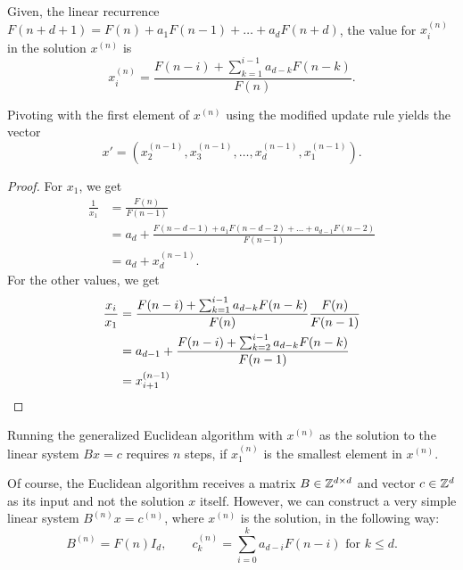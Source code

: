 Given, the linear recurrence $F(n + d + 1) = F(n) + a_1 F(n - 1) + \dots + a_d F(n + d)$,
the value for $x_i^{(n)}$ in the solution $x^{(n)}$ is
\begin{equation}
  \label{eq:general-solution}
  x_i^{(n)} = \frac{F(n - i) + \sum_{k=1}^{i-1} a_{d-k} F(n - k)}{F(n)}.
\end{equation}

\begin{lemma}
  Pivoting with the first element of $x^{(n)}$ using the modified update rule yields the vector
  \[
    x' = (x^{(n-1)}_2, x^{(n-1)}_3, \dots, x^{(n-1)}_d, x^{(n-1)}_1).
  \]
\end{lemma}

\begin{proof}
  For $x_1$, we get
  \[
    \begin{aligned}
      \frac{1}{x_1}
      & = \frac{F(n)}{F(n - 1)} \\
      & = a_d + \frac{F(n - d - 1) + a_1 F(n - d - 2) + \dots + a_{d-1} F(n - 2)}{F(n - 1)} \\
      & = a_d + x^{(n-1)}_d.
    \end{aligned}
  \]
  For the other values, we get
  \begin{align*}
    \frac{x_i}{x_1}
    & = \frac{F(n - i) + \sum_{k=1}^{i-1} a_{d-k} F(n - k)}{F(n)} \frac{F(n)}{F(n - 1)} \\
    & = a_{d-1} + \frac{F(n - i) + \sum_{k=2}^{i-1} a_{d-k} F(n - k)}{F(n-1)} \\
    & = x^{(n-1)}_{i+1} \qedhere
  \end{align*}
\end{proof}

\begin{corollary}
  Running the generalized Euclidean algorithm with $x^{(n)}$ as the solution to
  the linear system $B x = c$ requires $n$ steps, if $x^{(n)}_1$ is the
  smallest element in $x^{(n)}$.
\end{corollary}

Of course, the Euclidean algorithm receives a matrix $B \in {\mathbb Z}^{d \times d}$
and vector $c \in {\mathbb Z}^d$ as its input and not the solution $x$ itself.
However, we can construct a very simple linear system $B^{(n)} x = c^{(n)}$,
where $x^{(n)}$ is the solution, in the following way:
\[
  B^{(n)} = F(n) I_d, \qquad c^{(n)}_k = \sum_{i=0}^k a_{d-i} F(n - i) \text{ for } k ≤ d.
\]

